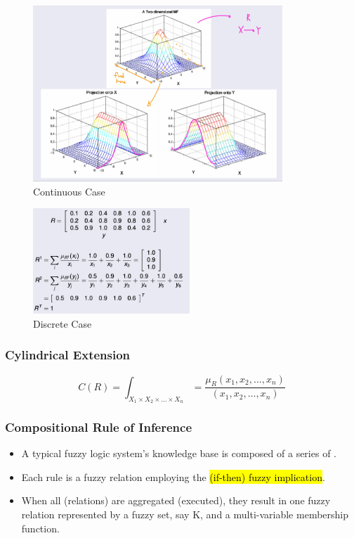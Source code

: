 \documentclass{tron}
\begin{document}
\begin{figure}[H]
	\centering
	\includegraphics[height=250px]{Figs/Fuzzy/projection2}
	\caption{Continuous Case}
	\label{fig:fuzzy:projection:ex2}
\end{figure}

\begin{figure}[H]
	\centering
	\includegraphics[height=150px]{Figs/Fuzzy/projection3}
	\caption{Discrete Case}
	\label{fig:fuzzy:projection:ex3}
\end{figure}

\subsubsection{Cylindrical Extension}
\begin{equation}
	C(R) = \int_{X_1 \times X_2 \times \dots \times X_n} = \frac{\mu_R (x_1, x_2, \dots, x_n)}{(x_1, x_2, \dots, x_n)}
\end{equation}

\subsubsection{Compositional Rule of Inference}
\begin{itemize}
	\item A typical fuzzy logic system's knowledge base is composed of a series of .
	\item Each rule is a fuzzy relation employing the \hl{(if-then) fuzzy implication}.
	\item When all  (relations) are aggregated (executed), they result in one fuzzy relation represented by a fuzzy set, say K, and a multi-variable membership function.
\end{itemize}
\end{document}
